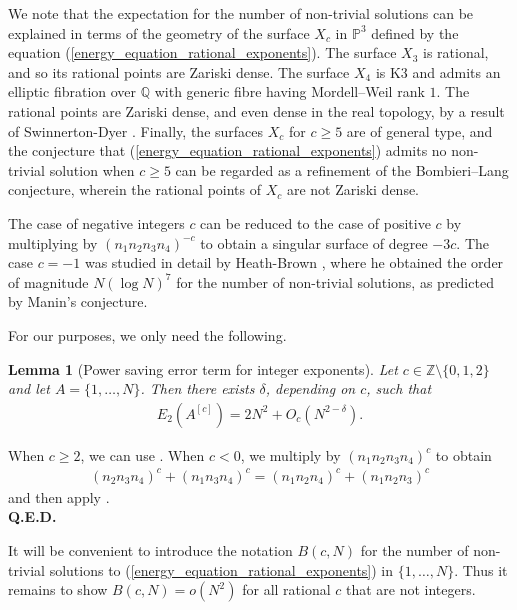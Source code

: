 \documentclass[9pt]{amsart}
\theoremstyle{my_theorem_style}
\numberwithin{definition}{section}
\newtheorem{lemma}[definition]{Lemma}
\renewenvironment{proof}{\noindent {\textbf{Proof.}}}{\\\textbf{Q.E.D.}}
\renewcommand{\P}{\mathbb{P}}
\newcommand{\Q}{\mathbb{Q}}
\newcommand{\Z}{\mathbb{Z}}
\begin{document}
We note that the expectation for the number of non-trivial solutions can be explained in terms of the geometry of the surface $X_c$ in $\P^3$ defined by the equation (\ref{energy_equation_rational_exponents}). The surface $X_3$ is rational, and so its rational points are Zariski dense. The surface $X_4$ is K3 and admits an elliptic fibration over $\Q$ with generic fibre having Mordell--Weil rank $1$. The rational points are Zariski dense, and even dense in the real topology, by a result of Swinnerton-Dyer \cite{Swinnerton-Dyer_A4+B4=C4+D4_revisted}. Finally, the surfaces $X_c$ for $c \geq 5$ are of general type, and the conjecture that (\ref{energy_equation_rational_exponents}) admits no non-trivial solution when $c \geq 5$ can be regarded as a refinement of the Bombieri--Lang conjecture, wherein the rational points of $X_c$ are not Zariski dense.

The case of negative integers $c$ can be reduced to the case of positive $c$ by multiplying by $(n_1n_2n_3n_4)^{-c}$ to obtain a singular surface of degree $-3c$. The case $c = -1$ was studied in detail by Heath-Brown \cite{Heath-Brown_Cayleys_cubic}, where he obtained the order of magnitude $N(\log{N})^7$ for the number of non-trivial solutions, as predicted by Manin's conjecture.

For our purposes, we only need the following.

\begin{lemma}
[Power saving error term for integer exponents]
\label{power_saving_for_integer_exponents}
    Let $c \in \Z \setminus \{0, 1, 2\}$ and let $A = \{1, \dots, N\}$. Then there exists $\delta$, depending on $c$, such that
    \begin{align*}
        E_2(A^{[c]}) = 2N^2 + O_c(N^{2 - \delta}).
    \end{align*}
\end{lemma}
\begin{proof}
    When $c \geq 2$, we can use \cite[Corollary 0.7]{Salberger_counting_rational_points_on_projective_varieties}. When $c < 0$, we multiply by $(n_1n_2n_3n_4)^c$ to obtain
    \begin{align*}
        (n_2n_3n_4)^c + (n_1n_3n_4)^c =
        (n_1n_2n_4)^c + (n_1n_2n_3)^c
    \end{align*}
    and then apply \cite[Theorem 0.5]{Salberger_counting_rational_points_on_projective_varieties}.
\end{proof}

It will be convenient to introduce the notation $B(c, N)$ for the number of non-trivial solutions to (\ref{energy_equation_rational_exponents}) in $\{1, \dots, N\}$. Thus it remains to show $B(c, N) = o(N^2)$ for all rational $c$ that are not integers.
\end{document}
